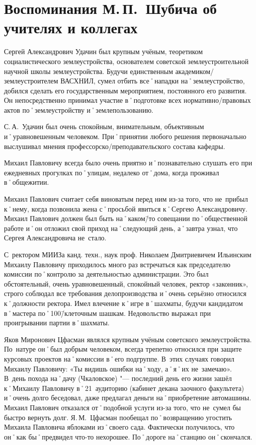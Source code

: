﻿\chapter[Воспоминания о коллегах]{Воспоминания М.\,П.~Шубича об учителях и коллегах}

Сергей Александрович Удачин был крупным учёным, теоретиком социалистического землеустройства, основателем советской землеустроительной научной школы землеустройства. Будучи единственным академиком\-/землеустроителем ВАСХНИЛ, сумел отбить все˚нападки на˚землеустройство, добился сделать его государственным мероприятием, постоянного его развития. Он непосредственно принимал участие в˚подготовке всех нормативно\-/правовых актов по˚землеустройству и˚землепользованию. 

С.\,А.~Удачин был очень спокойным, внимательным, объективным и˚уравновешенным человеком. При˚принятии любого решения первоначально выслушивал мнения профессорско\-/преподавательского состава кафедры. 

Михаил Павловичу всегда было очень приятно и˚познавательно слушать его при ежедневных прогулках по˚улицам, недалеко от˚дома, когда проживал в˚общежитии.

Михаил Павлович считает себя виноватым перед ним из-за того, что не~прибыл к˚нему, когда позвонила жена с˚просьбой явиться к˚Сергею Александровичу. Михаил Павлович должен был быть на˚каком\=/то совещании по˚общественной работе и˚он отложил свой приход на˚следующий день, а˚завтра узнал, что Сергея Александровича не~стало.
\enlargethispage{\baselineskip}	%
\pagebreak							%

С~ректором МИИЗа канд. техн., наук проф. Николаем Дмитриевичем Ильинским Михаилу Павловичу приходилось много раз встречаться как председателю комиссии по˚контролю за  деятельностью администрации. Это был обстоятельный, очень уравновешенный, спокойный человек, ректор «законник», строго соблюдал все требования делопроизводства и˚очень серьёзно относился к˚должности ректора. Имел влечение к˚игре в˚шахматы, будучи кандидатом в˚мастера по˚100\=/клеточным шашкам. Недовольство выражал при проигрывании партии в˚шахматы.

Яков Миронович Цфасман являлся крупным учёным советского землеустройства. По~натуре он˚был добрым человеком, всегда трепетно относился при защите курсовых проектов на˚комиссии в˚его подгруппе. В~этих случаях говорил Михаилу Павловичу: «Ты видишь ошибки на˚ходу, а˚я˚их не~замечаю». В~день похода на˚дачу (Чкаловское) "--- последний день его жизни зашёл к˚Михаилу Павловичу в˚21~аудиторию (кабинет декана заочного факультета) и˚очень долго беседовал, даже предлагал деньги на˚приобретение автомашины. Михаил Павлович отказался от˚подобной услуги из-за того, что не~сумел бы быстро вернуть долг. Я.\,М.~Цфасман пообещал по˚возвращению угостить Михаила Павловича яблоками из˚своего сада. Фактически получилось, что он˚как бы˚предвидел что-то нехорошее. По˚дороге на˚станцию он˚скончался.

